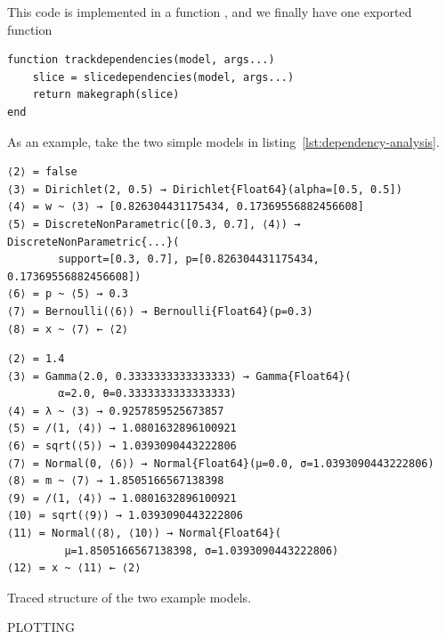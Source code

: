 This code is implemented in a function , and we finally have one exported function
\begin{lstlisting}
function trackdependencies(model, args...)
    slice = slicedependencies(model, args...)
    return makegraph(slice)
end
\end{lstlisting}
As an example, take the two simple models in listing~\ref{lst:dependency-analysis}.  

\newsavebox{\bernoullitrace}
\begin{lrbox}{\bernoullitrace}
\begin{lstlisting}[style=lstfloat]
⟨2⟩ = false
⟨3⟩ = Dirichlet(2, 0.5) → Dirichlet{Float64}(alpha=[0.5, 0.5])
⟨4⟩ = w ~ ⟨3⟩ → [0.826304431175434, 0.17369556882456608]
⟨5⟩ = DiscreteNonParametric([0.3, 0.7], ⟨4⟩) → DiscreteNonParametric{...}(
        support=[0.3, 0.7], p=[0.826304431175434, 0.17369556882456608])
⟨6⟩ = p ~ ⟨5⟩ → 0.3
⟨7⟩ = Bernoulli(⟨6⟩) → Bernoulli{Float64}(p=0.3)
⟨8⟩ = x ~ ⟨7⟩ ← ⟨2⟩
\end{lstlisting}
\end{lrbox}
\newsavebox{\gaussiantrace}
\begin{lrbox}{\gaussiantrace}
\begin{lstlisting}[style=lstfloat]
⟨2⟩ = 1.4
⟨3⟩ = Gamma(2.0, 0.3333333333333333) → Gamma{Float64}(
        α=2.0, θ=0.3333333333333333)
⟨4⟩ = λ ~ ⟨3⟩ → 0.9257859525673857
⟨5⟩ = /(1, ⟨4⟩) → 1.0801632896100921
⟨6⟩ = sqrt(⟨5⟩) → 1.0393090443222806
⟨7⟩ = Normal(0, ⟨6⟩) → Normal{Float64}(μ=0.0, σ=1.0393090443222806)
⟨8⟩ = m ~ ⟨7⟩ → 1.8505166567138398
⟨9⟩ = /(1, ⟨4⟩) → 1.0801632896100921
⟨10⟩ = sqrt(⟨9⟩) → 1.0393090443222806
⟨11⟩ = Normal(⟨8⟩, ⟨10⟩) → Normal{Float64}(
         μ=1.8505166567138398, σ=1.0393090443222806)
⟨12⟩ = x ~ ⟨11⟩ ← ⟨2⟩
\end{lstlisting}
\end{lrbox}
\begin{lstfloat}
  \loosesubcaptions
  \caption{Traced structure of the two example models.}
  \label{lst:trace-examples}
\end{lstfloat}




PLOTTING

